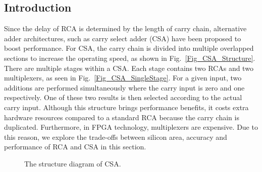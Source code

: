 \documentclass[journal]{IEEEtran}
\begin{document}
\subsection{Introduction}
Since the delay of RCA is determined by the length of carry chain, alternative adder architectures, such as carry select adder (CSA) have been proposed to boost performance. For CSA, the carry chain is divided into multiple overlapped sections to increase the operating speed, as shown in Fig.~\ref{Fig_CSA_Structure}. There are multiple stages within a CSA. Each stage contains two RCAs and two multiplexers, as seen in Fig.~\ref{Fig_CSA_SingleStage}. For a given input, two additions are performed simultaneously where the carry input is zero and one respectively. One of these two results is then selected according to the actual carry input. Although this structure brings performance benefits, it costs extra hardware resources compared to a standard RCA because the carry chain is duplicated. Furthermore, in FPGA technology, multiplexers are expensive. Due to this reason, we explore the trade-offs between silicon area, accuracy and performance of RCA and CSA in this section.

\begin{figure}[htbp]
    \begin{minipage}[b]{.49\textwidth}
        \centering
        \vspace{-2ex}
    \end{minipage}
    \centering
    \caption{The structure diagram of CSA.}
\end{figure}
\end{document}
